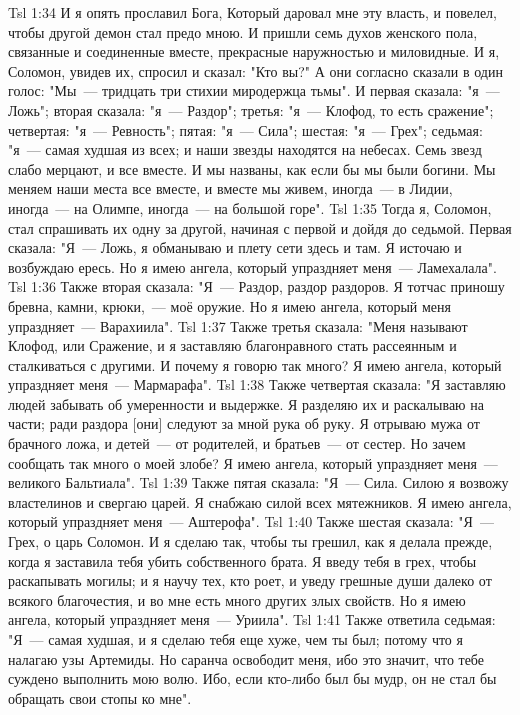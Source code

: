 \vs Tsl 1:34 
И я опять прославил Бога, Который даровал мне эту власть, и повелел, чтобы другой демон стал предо мною. И пришли семь духов женского пола, связанные и соединенные вместе, прекрасные наружностью и миловидные. И я, Соломон, увидев их, спросил и сказал: "Кто вы?" А они согласно сказали в один голос: "Мы~--- тридцать три стихии миродержца тьмы". И первая сказала: "я~--- Ложь"; вторая сказала: "я~--- Раздор"; третья: "я~--- Клофод, то есть сражение"; четвертая: "я~--- Ревность"; пятая: "я~--- Сила"; шестая: "я~--- Грех"; седьмая: "я~--- самая худшая из всех; и наши звезды находятся на небесах. Семь звезд слабо мерцают, и все вместе. И мы названы, как если бы мы были богини. Мы меняем наши места все вместе, и вместе мы живем, иногда~--- в Лидии, иногда~--- на Олимпе, иногда~--- на большой горе".
\vs Tsl 1:35 
Тогда я, Соломон, стал спрашивать их одну за другой, начиная с первой и дойдя до седьмой. Первая сказала: "Я~--- Ложь, я обманываю и плету сети здесь и там. Я источаю и возбуждаю ересь. Но я имею ангела, который упраздняет меня~--- Ламехалала".
\vs Tsl 1:36 
Также вторая сказала: "Я~--- Раздор, раздор раздоров. Я тотчас приношу бревна, камни, крюки,~--- моё оружие. Но я имею ангела, который меня упраздняет~--- Варахиила".
\vs Tsl 1:37 
Также третья сказала: "Меня называют Клофод, или Сражение, и я заставляю благонравного стать рассеянным и сталкиваться с другими. И почему я говорю так много? Я имею ангела, который упраздняет меня~--- Мармарафа".
\vs Tsl 1:38 
Также четвертая сказала: "Я заставляю людей забывать об умеренности и выдержке. Я разделяю их и раскалываю на части; ради раздора [они] следуют за мной рука об руку. Я отрываю мужа от брачного ложа, и детей~--- от родителей, и братьев~--- от сестер. Но зачем сообщать так много о моей злобе? Я имею ангела, который упраздняет меня~--- великого Бальтиала".
\vs Tsl 1:39 
Также пятая сказала: "Я~--- Сила. Силою я возвожу властелинов и свергаю царей. Я снабжаю силой всех мятежников. Я имею ангела, который упраздняет меня~--- Аштерофа".
\vs Tsl 1:40 
Также шестая сказала: "Я~--- Грех, о царь Соломон. И я сделаю так, чтобы ты грешил, как я делала прежде, когда я заставила тебя убить собственного брата. Я введу тебя в грех, чтобы раскапывать могилы; и я научу тех, кто роет, и уведу грешные души далеко от всякого благочестия, и во мне есть много других злых свойств. Но я имею ангела, который упраздняет меня~--- Уриила".
\vs Tsl 1:41 
Также ответила седьмая: "Я~--- самая худшая, и я сделаю тебя еще хуже, чем ты был; потому что я налагаю узы Артемиды. Но саранча освободит меня, ибо это значит, что тебе суждено выполнить мою волю. Ибо, если кто-либо был бы мудр, он не стал бы обращать свои стопы ко мне".
